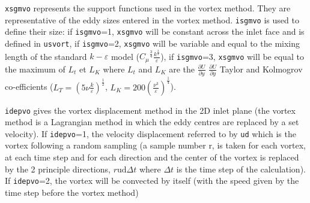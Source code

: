 {{{\begin{list}{-}{}
\begin{list}{*}{}
\item \texttt{xsgmvo} represents the support functions used in the vortex
  method. They are representative of the eddy sizes entered in the vortex
  method.
  \texttt{isgmvo} is used to define their size: if \texttt{isgmvo}=1,
  \texttt{xsgmvo} will be constant across the inlet face and is defined in
  \texttt{usvort}, if \texttt{isgmvo}=2, \texttt{xsgmvo} will be variable and
  equal to the mixing length of the standard $k-\varepsilon$ model
  ($\displaystyle {C_\mu}^{\frac{3}{4}} \displaystyle \frac{k^{\frac{3}{2}}}{\varepsilon}$), if
  \texttt{isgmvo}=3, \texttt{xsgmvo} will be equal to the maximum of $L_t$ et
  $L_K$ where $L_t$ and $L_K$ are the $\displaystyle \frac{\partial U}{\partial y}$
  $\displaystyle \frac{\partial U}{\partial y}$
  Taylor and Kolmogrov co-efficients
  ($\displaystyle L_T=(5 \nu \frac{k}{\displaystyle \varepsilon})^{\frac{1}{2}}$,
  $\displaystyle L_K= 200 (\frac{\nu^3}{\varepsilon})^{\frac{1}{4}}$).

\item \texttt{idepvo} gives the vortex displacement method in the 2D inlet plane
  (the vortex method is a Lagrangian method in which the eddy centres are
  replaced by a set velocity). If \texttt{idepvo}=1, the velocity displacement
  referred to by \texttt{ud} which is the vortex following a random sampling
  (a sample number r, is taken for each vortex, at each time step and for each direction and
  the center of the vortex is replaced by the 2 principle directions,
  $r \mbox{ud} \Delta t$ where $\Delta t$ is the time step of the calculation).
  If \texttt{idepvo}=2, the vortex will be convected by itself (with the speed
  given by the time step before the vortex method)
\end{list}


\end{list}}}}
